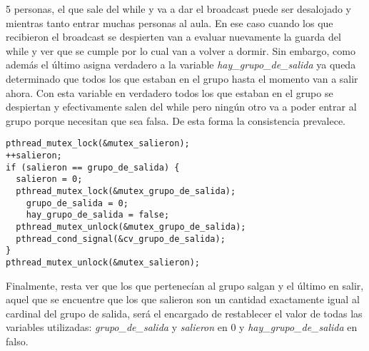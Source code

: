 5 personas, el que sale del while y va a dar el broadcast puede ser desalojado y mientras
tanto entrar muchas personas al aula. En ese caso cuando los que recibieron el broadcast se
despierten van a evaluar nuevamente la guarda del while y ver que se cumple por lo cual
van a volver a dormir. Sin embargo, como además el último asigna verdadero a la variable
\textit{hay\_grupo\_de\_salida} ya queda determinado que todos los que estaban en el grupo
hasta el momento van a salir ahora. Con esta variable en verdadero todos los que estaban
en el grupo se despiertan y efectivamente salen del while pero ningún otro va a poder
entrar al grupo porque necesitan que sea falsa. De esta forma la consistencia prevalece.
\begin{center}
\begin{minipage}{1.05\textwidth}
\begin{lstlisting}[frame=lrtb]
pthread_mutex_lock(&mutex_salieron);
++salieron;
if (salieron == grupo_de_salida) {
  salieron = 0;
  pthread_mutex_lock(&mutex_grupo_de_salida);			
    grupo_de_salida = 0;
    hay_grupo_de_salida = false;
  pthread_mutex_unlock(&mutex_grupo_de_salida);
  pthread_cond_signal(&cv_grupo_de_salida);
}
pthread_mutex_unlock(&mutex_salieron);
\end{lstlisting}
\end{minipage}
\end{center}
Finalmente, resta ver que los que pertenecían al grupo salgan y el último en salir, aquel
que se encuentre que los que salieron son un cantidad exactamente igual al cardinal
del grupo de salida, será el encargado de restablecer el valor de todas las variables
utilizadas: \textit{grupo\_de\_salida} y \textit{salieron} en 0 y 
\textit{hay\_grupo\_de\_salida} en falso.


